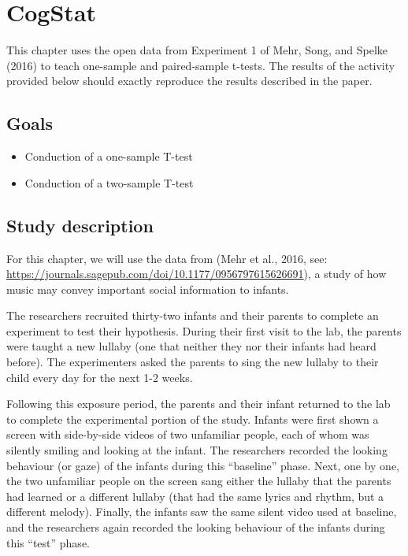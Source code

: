 \documentclass[
]{book}
\begin{document}
\hypertarget{cogstat-7}{%
\section{CogStat}\label{cogstat-7}}

This chapter uses the open data from Experiment 1 of Mehr, Song, and Spelke (2016) to teach one-sample and paired-sample t-tests. The results of the activity provided below should exactly reproduce the results described in the paper.

\hypertarget{goals-5}{%
\subsection{Goals}\label{goals-5}}

\begin{itemize}
\item
  Conduction of a one-sample T-test
\item
  Conduction of a two-sample T-test
\end{itemize}

\hypertarget{study-description-1}{%
\subsection{Study description}\label{study-description-1}}

For this chapter, we will use the data from (Mehr et al., 2016, see: \url{https://journals.sagepub.com/doi/10.1177/0956797615626691}), a study of how music may convey important social information to infants.

The researchers recruited thirty-two infants and their parents to complete an experiment to test their hypothesis. During their first visit to the lab, the parents were taught a new lullaby (one that neither they nor their infants had heard before). The experimenters asked the parents to sing the new lullaby to their child every day for the next 1-2 weeks.

Following this exposure period, the parents and their infant returned to the lab to complete the experimental portion of the study. Infants were first shown a screen with side-by-side videos of two unfamiliar people, each of whom was silently smiling and looking at the infant. The researchers recorded the looking behaviour (or gaze) of the infants during this ``baseline'' phase. Next, one by one, the two unfamiliar people on the screen sang either the lullaby that the parents had learned or a different lullaby (that had the same lyrics and rhythm, but a different melody). Finally, the infants saw the same silent video used at baseline, and the researchers again recorded the looking behaviour of the infants during this ``test'' phase.
\end{document}
